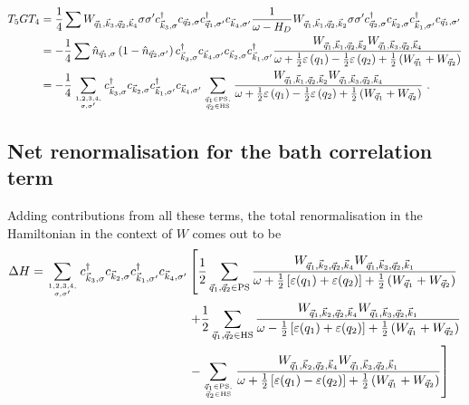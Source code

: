 \documentclass{revtex4-2}
\begin{document}
\begin{equation}\begin{aligned}
	T_5 G T_4 &= \frac{1}{4}\sum W_{\vec q_1, \vec k_3, \vec q_2, \vec k_4} \sigma\sigma^\prime c^\dagger_{\vec k_3,\sigma}c_{\vec q_2,\sigma}c^\dagger_{\vec q_1,\sigma^\prime}c_{\vec k_4,\sigma^\prime} \frac{1}{\omega - H_D} W_{\vec q_1,\vec k_1, \vec q_2, \vec k_2} \sigma\sigma^\prime c^\dagger_{\vec q_2,\sigma}c_{\vec k_2,\sigma}c^\dagger_{\vec k_1,\sigma^\prime}c_{\vec q_1,\sigma^\prime}\\
		  &= -\frac{1}{4}\sum \hat n_{\vec q_1,\sigma} \left(1 - \hat n_{\vec q_2,\sigma^\prime}\right) c^\dagger_{\vec k_3,\sigma}c_{\vec k_4,\sigma^\prime} c_{\vec k_2,\sigma} c^\dagger_{\vec k_1,\sigma^\prime} \frac{W_{\vec q_1,\vec k_1, \vec q_2, \vec k_2} W_{\vec q_1, \vec k_3, \vec q_2, \vec k_4}}{\omega + \frac{1}{2}\varepsilon\left(q_1\right) - \frac{1}{2}\varepsilon\left(q_2\right) + \frac{1}{2}\left(W_{\vec q_1} + W_{\vec q_2}\right)}  \\
		  &= -\frac{1}{4}\sum_{1,2,3,4,\atop{\sigma,\sigma^\prime}} c^\dagger_{\vec k_3,\sigma} c_{\vec k_2,\sigma} c^\dagger_{\vec k_1,\sigma^\prime}c_{\vec k_4,\sigma^\prime}\sum_{\vec q_1 \in \text{PS}, \atop{\vec q_2 \in \text{HS}}}\frac{W_{\vec q_1,\vec k_1, \vec q_2, \vec k_2} W_{\vec q_1, \vec k_3, \vec q_2, \vec k_4}}{\omega + \frac{1}{2}\varepsilon\left(q_1\right) - \frac{1}{2}\varepsilon\left(q_2\right) + \frac{1}{2}\left(W_{\vec q_1} + W_{\vec q_2}\right)}~.
\end{aligned}\end{equation}

\subsection{Net renormalisation for the bath correlation term}
Adding contributions from all these terms, the total renormalisation in the Hamiltonian in the context of \(W\) comes out to be
\begin{equation}\begin{aligned}
	\Delta H = \sum_{1,2,3,4,\atop{\sigma,\sigma^\prime}} c^\dagger_{\vec k_3,\sigma} c_{\vec k_2,\sigma} c^\dagger_{\vec k_1,\sigma^\prime}c_{\vec k_4,\sigma^\prime}&\left[\frac{1}{2}\sum_{\vec q_1, \vec q_2 \in \text{PS}}\frac{W_{\vec q_1,\vec k_2, \vec q_2, \vec k_4} W_{\vec q_1,\vec k_3, \vec q_2, \vec k_1}}{\omega + \frac{1}{2}\left[\varepsilon(q_1) + \varepsilon(q_2)\right] + \frac{1}{2}\left(W_{\vec q_1} + W_{\vec q_2}\right)} \right. \\
		  &\left. + \frac{1}{2}\sum_{\vec q_1, \vec q_2 \in \text{HS}}\frac{W_{\vec q_1,\vec k_2, \vec q_2, \vec k_4} W_{\vec q_1,\vec k_3, \vec q_2, \vec k_1}}{\omega - \frac{1}{2}\left[\varepsilon(q_1) + \varepsilon(q_2)\right] + \frac{1}{2}\left(W_{\vec q_1} + W_{\vec q_2}\right)} \right. \\
		  &\left. - \sum_{\vec q_1 \in \text{PS}, \atop{\vec q_2 \in \text{HS}}}\frac{W_{\vec q_1,\vec k_2, \vec q_2, \vec k_4} W_{\vec q_1,\vec k_3, \vec q_2, \vec k_1}}{\omega + \frac{1}{2}\left[\varepsilon(q_1) - \varepsilon(q_2)\right] + \frac{1}{2}\left(W_{\vec q_1} + W_{\vec q_2}\right)} \right]
\end{aligned}\end{equation}
\end{document}
